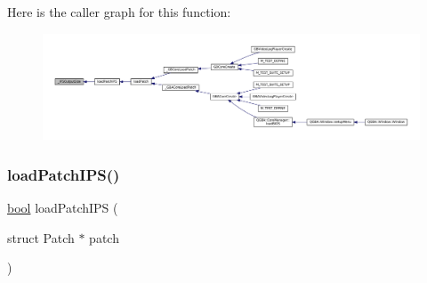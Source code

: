 Here is the caller graph for this function\+:
\nopagebreak
\begin{figure}[H]
\begin{center}
\leavevmode
\includegraphics[width=350pt]{patch-ips_8c_a7a563fa349ed7b67a6d504fd40efc92e_icgraph}
\end{center}
\end{figure}
\mbox{\label{patch-ips_8c_ac86a44af7cc9232c26a9c1fbfd2cea40}} 
\subsubsection{\texorpdfstring{load\+Patch\+I\+P\+S()}{loadPatchIPS()}}
{\footnotesize\ttfamily \mbox{\hyperlink{libretro_8h_a4a26dcae73fb7e1528214a068aca317e}{bool}} load\+Patch\+I\+PS (\begin{DoxyParamCaption}\item[{struct Patch $\ast$}]{patch }\end{DoxyParamCaption})}

